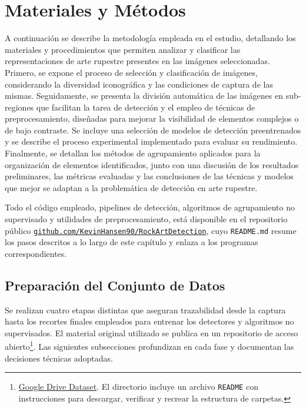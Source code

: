 \chapter{Materiales y Métodos}

A continuación se describe la metodología empleada en el estudio, detallando los materiales y procedimientos que permiten analizar y clasificar las representaciones de arte rupestre presentes en las imágenes seleccionadas.
Primero, se expone el proceso de selección y clasificación de imágenes, considerando la diversidad iconográfica y las condiciones de captura de las mismas.
Seguidamente, se presenta la división automática de las imágenes en sub-regiones que facilitan la tarea de detección y el empleo de técnicas de preprocesamiento, diseñadas para mejorar la visibilidad de elementos complejos o de bajo contraste.
Se incluye una selección de modelos de detección preentrenados y se describe el proceso experimental implementado para evaluar su rendimiento.
Finalmente, se detallan los métodos de agrupamiento aplicados para la organización de elementos identificados, junto con una discusión de los resultados preliminares, las métricas evaluadas y las conclusiones de las técnicas y modelos que mejor se adaptan a la problemática de detección en arte rupestre.


\noindent
Todo el código empleado, pipelines de detección, algoritmos de agrupamiento no supervisado y utilidades de preprocesamiento, está disponible en el repositorio público
\href{https://github.com/KevinHansen90/RockArtDetection}{\texttt{github.com/KevinHansen90/RockArtDetection}}, cuyo \texttt{README.md} resume los pasos descritos a lo largo de este capítulo y enlaza a los programas correspondientes.

\section{Preparación del Conjunto de Datos}

Se realizan cuatro etapas distintas que aseguran trazabilidad desde la captura hasta los recortes finales empleados para entrenar los detectores y algoritmos no supervisados.
El material original utilizado se publica en un repositorio de acceso abierto\footnote{\href{https://drive.google.com/drive/u/0/folders/1JU5tohaRw7Rm83S9uUK9KazIPLRebl1x}{Google Drive Dataset}.
El directorio incluye un archivo \texttt{README} con instrucciones para descargar, verificar y recrear la estructura de carpetas.}.
Las siguientes subsecciones profundizan en cada fase y documentan las decisiones técnicas adoptadas.

